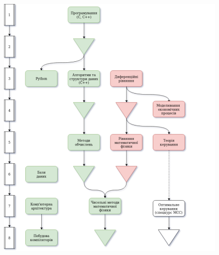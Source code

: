 \documentclass[14pt, a4paper]{extarticle}  %
\begin{document}
\begin{figure}[ht]
\centering
\includegraphics[scale=0.57]{CourseworkTree_2.png}
\end{figure}
\end{document}
